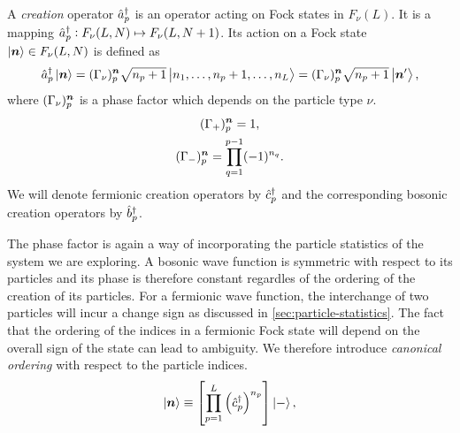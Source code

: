             \begin{definition}
                \label{def:creation_1}
                A \emph{creation} operator $\hat{a}_{p}^{\dagger}$ is an operator acting on
                Fock states in $F_{\nu}(L)$.
                It is a mapping $\hat{a}_{p}^{\dagger}: F_{\nu}(L, N) \mapsto F_{\nu}(L, N +
                1)$.
                Its action on a Fock state $\ket{\boldsymbol{n}} \in F_{\nu}(L, N)$ is
                defined as
                \begin{align}
                    \hat{a}_{p}^{\dagger}\ket{\boldsymbol{n}}
                    = (\Gamma_{\nu})^{\boldsymbol{n}}_{p}
                    \sqrt{n_p + 1}
                    \ket{n_1, \dots, n_p + 1, \dots, n_L}
                    = (\Gamma_{\nu})^{\boldsymbol{n}}_{p}
                    \sqrt{n_p + 1}
                    \ket{\boldsymbol{n}'},
                    \label{eq:general_creation}
                \end{align}
                where $(\Gamma_{\nu})^{\boldsymbol{n}}_{p}$ is a phase factor which
                depends on the particle type $\nu$.
                \begin{gather}
                    (\Gamma_{+})^{\boldsymbol{n}}_{p} = 1, \\
                    (\Gamma_{-})^{\boldsymbol{n}}_{p}
                    = \prod_{q = 1}^{p - 1} (-1)^{n_q}.
                \end{gather}
                We will denote fermionic creation operators by $\hat{c}_{p}^{\dagger}$ and the
                corresponding bosonic creation operators by $\hat{b}_{p}^{\dagger}$.
            \end{definition}
            The phase factor is again a way of incorporating the particle
            statistics of the system we are exploring.
            A bosonic wave function is symmetric with respect to its particles
            and its phase is therefore constant regardles of the ordering of the
            creation of its particles.
            For a fermionic wave function, the interchange of two particles will
            incur a change sign as discussed in
            \autoref{sec:particle-statistics}.
            The fact that the ordering of the indices in a fermionic Fock state
            will depend on the overall sign of the state can lead to ambiguity.
            We therefore introduce \emph{canonical ordering} with respect to the
            particle indices.
            \begin{align}
                \ket{\boldsymbol{n}}
                \equiv \left[ 
                    \prod_{p = 1}^{L}
                    \left( \hat{c}_{p}^{\dagger} \right)^{n_p}
                 \right]\ket{-},
                \label{eq:canonical-fock-state}
            \end{align}
